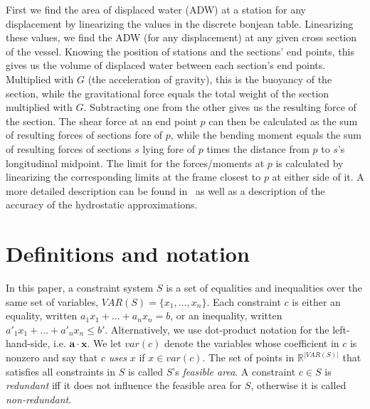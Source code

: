 \documentclass{llncs}
\newcommand{\var}{\mathit{var}}
\newcommand{\VAR}{\mathit{VAR}}
\newcommand{\ve}{\mathbf}
\begin{document}
First we find the area of displaced water (ADW) at a station for any displacement by linearizing the values in the discrete bonjean table. Linearizing these values, we find the ADW (for any displacement) at any given cross section of the vessel. Knowing the position of stations and the sections' end points, this gives us the volume of displaced water between each section's end points. Multiplied with $G$ (the acceleration of gravity), this is the buoyancy of the section, while the gravitational force equals the total weight of the section multiplied with $G$. Subtracting one from the other gives us the resulting force of the section. The shear force at an end point $p$ can then be calculated as the sum of resulting forces of sections fore of $p$, while the bending moment equals the sum of resulting forces of sections $s$ lying fore of $p$ times the distance from $p$ to $s$'s longitudinal midpoint.
The limit for the forces/moments at $p$ is calculated by linearizing the corresponding limits at the frame closest to $p$ at either side of it.  
A more detailed description can be found in~\cite{ICCL18} as well as a description of the accuracy of the hydrostatic approximations.

\section{Definitions and notation} \label{sec:notation}
In this paper, a constraint system $S$ is a set of equalities and inequalities over the same set of variables, $\VAR(S)=\{x_1,\ldots, x_n\}$. Each constraint $c$ is either an equality, written $a_1x_1 + \ldots +a_nx_n = b$, or an inequality, written $a'_1x_1 + \ldots +a'_nx_n\leq b'$. Alternatively, we use dot-product notation for the left-hand-side, i.e. $\ve{a}\cdot \ve{x}$. 
We let $\var(c)$ denote the variables whose coefficient in $c$ is nonzero and say that $c$ \emph{uses} $x$ if $x\in \var(c)$. 
The set of points in $\mathbb{R}^{|\VAR(S)|}$ that satisfies all constraints in $S$ is called $S$'s \emph{feasible area}. A constraint $c\in S$ is \emph{redundant} iff it does not influence the feasible area for $S$, otherwise it is called \emph{non-redundant}.  
\end{document}
